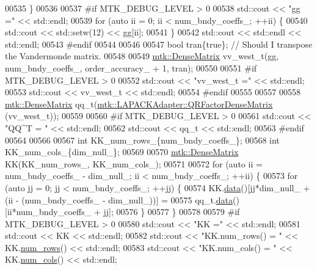 \begin{DoxyCode}
{{00535   \}
00536 
00537 \textcolor{preprocessor}{  #if MTK\_DEBUG\_LEVEL > 0}
00538   std::cout << \textcolor{stringliteral}{"gg ="} << std::endl;
00539   \textcolor{keywordflow}{for} (\textcolor{keyword}{auto} ii = 0; ii < num\_bndy\_coeffs\_; ++ii) \{
00540     std::cout << std::setw(12) << gg[ii];
00541   \}
00542   std::cout << std::endl << std::endl;
00543 \textcolor{preprocessor}{  #endif}
00544 
00546 
00547   \textcolor{keywordtype}{bool} tran\{\textcolor{keyword}{true}\}; \textcolor{comment}{// Should I transpose the Vandermonde matrix.}
00548 
00549   \hyperlink{classmtk_1_1DenseMatrix}{mtk::DenseMatrix} vv\_west\_t(gg, num\_bndy\_coeffs\_, order\_accuracy\_ + 1, tran);
00550 
00551 \textcolor{preprocessor}{  #if MTK\_DEBUG\_LEVEL > 0}
00552   std::cout << \textcolor{stringliteral}{"vv\_west\_t ="} << std::endl;
00553   std::cout << vv\_west\_t << std::endl;
00554 \textcolor{preprocessor}{  #endif}
00555 
00557 
00558   \hyperlink{classmtk_1_1DenseMatrix}{mtk::DenseMatrix} qq\_t(\hyperlink{classmtk_1_1LAPACKAdapter_ae5c6e78c9c819c9ac7a6f31bfd011d7a}{mtk::LAPACKAdapter::QRFactorDenseMatrix}
      (vv\_west\_t));
00559 
00560 \textcolor{preprocessor}{  #if MTK\_DEBUG\_LEVEL > 0}
00561   std::cout << \textcolor{stringliteral}{"QQ^T = "} << std::endl;
00562   std::cout << qq\_t << std::endl;
00563 \textcolor{preprocessor}{  #endif}
00564 
00566 
00567   \textcolor{keywordtype}{int} KK\_num\_rows\_\{num\_bndy\_coeffs\_\};
00568   \textcolor{keywordtype}{int} KK\_num\_cols\_\{dim\_null\_\};
00569 
00570   \hyperlink{classmtk_1_1DenseMatrix}{mtk::DenseMatrix} KK(KK\_num\_rows\_, KK\_num\_cols\_);
00571 
00572   \textcolor{keywordflow}{for} (\textcolor{keyword}{auto} ii = num\_bndy\_coeffs\_ - dim\_null\_; ii < num\_bndy\_coeffs\_; ++ii) \{
00573     \textcolor{keywordflow}{for} (\textcolor{keyword}{auto} jj = 0; jj < num\_bndy\_coeffs\_; ++jj) \{
00574       KK.\hyperlink{classmtk_1_1DenseMatrix_a16b3ff56feb2658b9fc7147d1de4d8e7}{data}()[jj*dim\_null\_ + (ii - (num\_bndy\_coeffs\_ - dim\_null\_))] =
00575           qq\_t.\hyperlink{classmtk_1_1DenseMatrix_a16b3ff56feb2658b9fc7147d1de4d8e7}{data}()[ii*num\_bndy\_coeffs\_ + jj];
00576     \}
00577   \}
00578 
00579 \textcolor{preprocessor}{  #if MTK\_DEBUG\_LEVEL > 0}
00580   std::cout << \textcolor{stringliteral}{"KK ="} << std::endl;
00581   std::cout << KK << std::endl;
00582   std::cout << \textcolor{stringliteral}{"KK.num\_rows() = "} << KK.\hyperlink{classmtk_1_1DenseMatrix_a17d8d3b9cc0926044b6972dd190a5c21}{num\_rows}() << std::endl;
00583   std::cout << \textcolor{stringliteral}{"KK.num\_cols() = "} << KK.\hyperlink{classmtk_1_1DenseMatrix_af6f78373aaf2136f0c78974d7c8de0a8}{num\_cols}() << std::endl;
}}
\end{DoxyCode}
